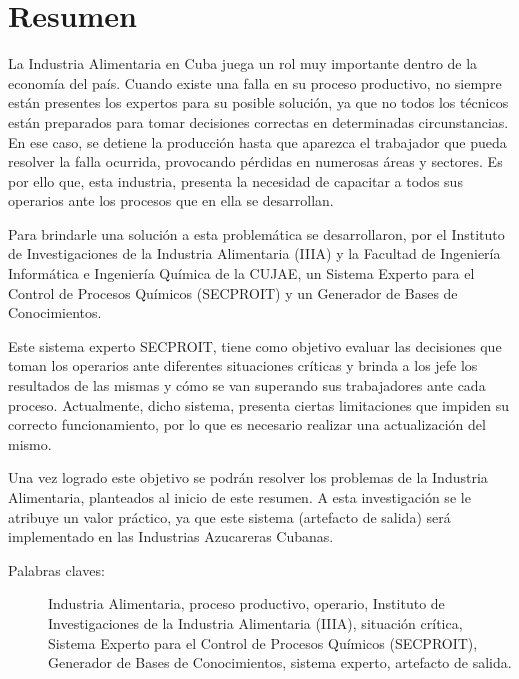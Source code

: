 \section*{Resumen}
La Industria Alimentaria en Cuba juega un rol muy importante dentro de la economía del país. Cuando existe una falla en su proceso productivo, no siempre están presentes los expertos para su posible solución, ya que no todos los técnicos están preparados para tomar decisiones correctas en determinadas circunstancias. En ese caso, se detiene la producción hasta que aparezca el trabajador que pueda resolver la falla ocurrida, provocando pérdidas en numerosas áreas y sectores. Es por ello que, esta industria, presenta la necesidad de capacitar a todos sus operarios ante los procesos que en ella se desarrollan.

Para brindarle una solución a esta problemática se desarrollaron, por el Instituto de Investigaciones de la Industria Alimentaria (IIIA) y la Facultad de Ingeniería Informática e Ingeniería Química de la CUJAE, un Sistema Experto para el Control de Procesos Químicos (SECPROIT) y un Generador de Bases de Conocimientos.

Este sistema experto SECPROIT, tiene como objetivo evaluar las decisiones que toman los operarios ante diferentes situaciones críticas y brinda a los jefe los resultados de las mismas y cómo se van superando sus trabajadores ante cada proceso. Actualmente, dicho sistema, presenta ciertas limitaciones que impiden su correcto funcionamiento, por lo que es necesario realizar una actualización del mismo.

Una vez logrado este objetivo se podrán resolver los problemas de la Industria Alimentaria, planteados al inicio de este resumen. A esta investigación se le atribuye un valor práctico, ya que este sistema (artefacto de salida) será implementado en las Industrias Azucareras Cubanas.

\vfill

\begin{description}
	\item[Palabras claves:]{Industria Alimentaria, proceso productivo, operario, Instituto de Investigaciones de la Industria Alimentaria (IIIA), situación crítica, Sistema Experto para el Control de Procesos Químicos (SECPROIT), Generador de Bases de Conocimientos, sistema experto, artefacto de salida.}
\end{description}


